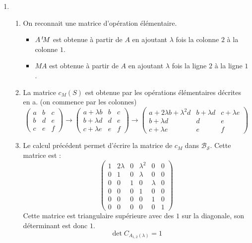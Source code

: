 \begin{enumerate}
\item \begin{enumerate}
 \item On reconnait une matrice d'opération élémentaire.
\begin{itemize}
 \item $A\,\mathstrut^t\! M$ est obtenue à partir de $A$ en ajoutant $\lambda$ fois la colonne $2$ à la colonne $1$.
 \item $M A$ est obtenue à partir de $A$ en ajoutant $\lambda$ fois la ligne $2$ à la ligne $1$.
\end{itemize}
\item La matrice $c_M(S)$ est obtenue par les opérations élémentaires décrites en a. (on commence par les colonnes)
\begin{displaymath}
\begin{pmatrix}
 a & b & c \\ b & d & e \\ c & e & f
\end{pmatrix}
\rightarrow
\begin{pmatrix}
 a+\lambda b & b & c \\ b+\lambda d & d & e \\ c+\lambda e & e & f
\end{pmatrix}
\rightarrow
\begin{pmatrix}
 a+2\lambda b +\lambda^2 d & b +\lambda d & c+\lambda e \\
 b+\lambda d               & d            & e           \\
 c+\lambda e               & e            & f
\end{pmatrix}
\end{displaymath}
\item Le calcul précédent permet d'écrire la matrice de $c_M$ dans $\mathcal B_{\mathcal S}$. Cette matrice est :
\begin{displaymath}
 \begin{pmatrix}
1 & 2\lambda & 0 & \lambda^2 & 0       & 0 \\ 
0 & 1        & 0 & \lambda   & 0       & 0 \\ 
0 & 0        & 1 & 0         & \lambda & 0 \\ 
0 & 0        & 0 & 1         & 0       & 0 \\ 
0 & 0        & 0 & 0         & 1       & 0 \\ 
0 & 0        & 0 & 0         & 0       & 1 
 \end{pmatrix}
\end{displaymath}
Cette matrice est triangulaire supérieure avec des $1$ sur la diagonale, son déterminant est donc $1$.
\begin{displaymath}
 \det C_{A_{1,2}(\lambda)}=1
\end{displaymath}
\end{enumerate}


\end{enumerate}
